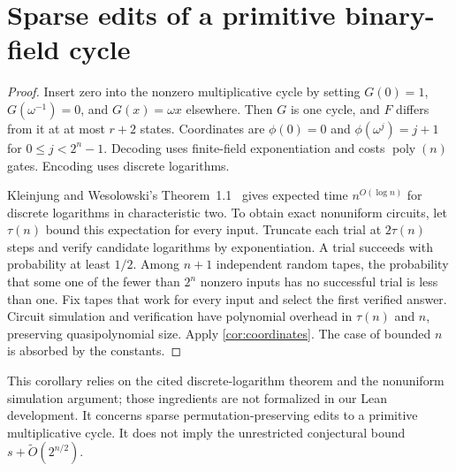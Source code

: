 \documentclass[11pt]{article}
\newtheorem{corollary}[theorem]{Corollary}
\theoremstyle{definition}
\theoremstyle{remark}
\newcommand{\CC}{\mathrm{C}}
\newcommand{\poly}{\operatorname{poly}}
\numberwithin{equation}{section}
\begin{document}
\section{Sparse edits of a primitive binary-field cycle}\label{app:binary-field}

\begin{proof}
Insert zero into the nonzero multiplicative cycle by setting
$G(0)=1$, $G(\omega^{-1})=0$, and $G(x)=\omega x$ elsewhere.
Then $G$ is one cycle, and $F$ differs from it at at most $r+2$ states.
Coordinates are
$\phi(0)=0$ and $\phi(\omega^j)=j+1$ for $0\leq j<2^n-1$.
Decoding uses finite-field exponentiation and costs $\poly(n)$ gates.
Encoding uses discrete logarithms.

Kleinjung and Wesolowski's Theorem~1.1~\cite{KW22} gives expected time
$n^{O(\log n)}$ for discrete logarithms in characteristic two.
To obtain exact nonuniform circuits, let $\tau(n)$ bound this expectation
for every input.  Truncate each trial at $2\tau(n)$ steps and verify
candidate logarithms by exponentiation.  A trial succeeds with probability
at least $1/2$.  Among $n+1$ independent random tapes, the probability that
some one of the fewer than $2^n$ nonzero inputs has no successful trial is
less than one.  Fix tapes that work for every input and select the first
verified answer.  Circuit simulation and verification have polynomial
overhead in $\tau(n)$ and $n$, preserving quasipolynomial size.
Apply \cref{cor:coordinates}.  The case of bounded $n$ is absorbed by
the constants.
\end{proof}

This corollary relies on the cited discrete-logarithm theorem and the
nonuniform simulation argument; those ingredients are not formalized in
our Lean development.  It concerns sparse permutation-preserving edits
to a primitive multiplicative cycle.  It does not imply the unrestricted
conjectural bound $s+\widetilde O(2^{n/2})$.
\end{document}
